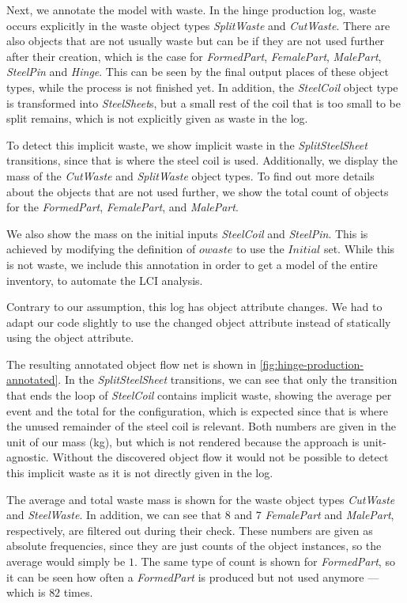 Next, we annotate the model with waste.
In the hinge production log, waste occurs explicitly in the waste object types \emph{SplitWaste} and \emph{CutWaste}.
There are also objects that are not usually waste but can be if they are not used further after their creation, which is the case for \emph{FormedPart}, \emph{FemalePart}, \emph{MalePart}, \emph{SteelPin} and \emph{Hinge}.
This can be seen by the final output places of these object types, while the process is not finished yet.
In addition, the \emph{SteelCoil} object type is transformed into \emph{SteelSheet}s, but a small rest of the coil that is too small to be split remains, which is not explicitly given as waste in the log.



To detect this implicit waste, we show implicit waste in the \emph{SplitSteelSheet} transitions, since that is where the steel coil is used.
Additionally, we display the mass of the \emph{CutWaste} and \emph{SplitWaste} object types.
To find out more details about the objects that are not used further, we show the total count of objects for the \emph{FormedPart}, \emph{FemalePart}, and \emph{MalePart}.


We also show the mass on the initial inputs \emph{SteelCoil} and \emph{SteelPin}.
This is achieved by modifying the definition of $owaste$ to use the $Initial$ set.
While this is not waste, we include this annotation in order to get a model of the entire inventory, to automate the LCI analysis.


Contrary to our assumption, this log has object attribute changes.
We had to adapt our code slightly to use the changed object attribute instead of statically using the object attribute.



The resulting annotated object flow net is shown in \autoref{fig:hinge-production-annotated}.
In the \emph{SplitSteelSheet} transitions, we can see that only the transition that ends the loop of \emph{SteelCoil} contains implicit waste, showing the average per event and the total for the configuration, which is expected since that is where the unused remainder of the steel coil is relevant.
Both numbers are given in the unit of our mass (kg), but which is not rendered because the approach is unit-agnostic.
Without the discovered object flow it would not be possible to detect this implicit waste as it is not directly given in the log.


The average and total waste mass is shown for the waste object types \emph{CutWaste} and \emph{SteelWaste}.
In addition, we can see that $8$ and $7$ \emph{FemalePart} and \emph{MalePart}, respectively, are filtered out during their check.
These numbers are given as absolute frequencies, since they are just counts of the object instances, so the average would simply be $1$.
The same type of count is shown for \emph{FormedPart}, so it can be seen how often a \emph{FormedPart} is produced but not used anymore --- which is $82$ times.



